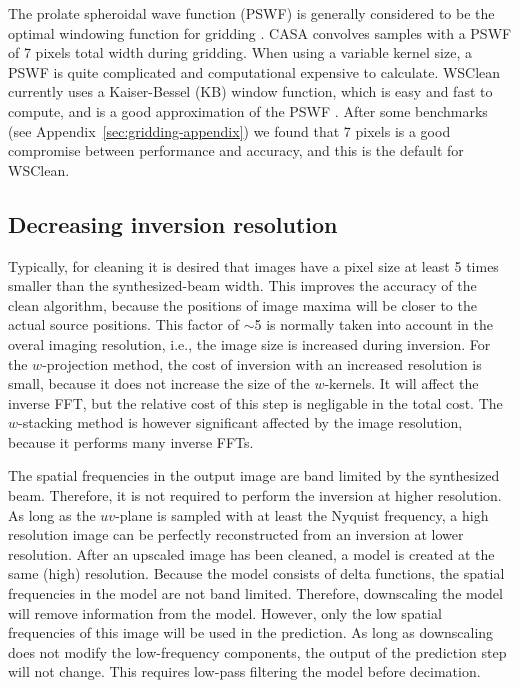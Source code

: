 \documentclass[useAMS,usenatbib]{mn2e}
\begin{document}
The prolate spheroidal wave function (PSWF) is generally considered to be the optimal windowing function for gridding \citep{fourier-kernel-selection-1991}. CASA convolves samples with a PSWF of 7 pixels total width during gridding. When using a variable kernel size, a PSWF is quite complicated and computational expensive to calculate. WSClean currently uses a Kaiser-Bessel (KB) window function, which is easy and fast to compute, and is a good approximation of the PSWF \citep{fourier-kernel-selection-1991}. After some benchmarks (see Appendix~\ref{sec:gridding-appendix}) we found that 7 pixels is a good compromise between performance and accuracy, and this is the default for WSClean.

\subsection{Decreasing inversion resolution} \label{sec:decreasing-inversion-resolution}
Typically, for cleaning it is desired that images have a pixel size at least 5 times smaller than the synthesized-beam width. This improves the accuracy of the clean algorithm, because the positions of image maxima will be closer to the actual source positions. This factor of $\sim$5 is normally taken into account in the overal imaging resolution, i.e., the image size is increased during inversion. For the $w$-projection method, the cost of inversion with an increased resolution is small, because it does not increase the size of the $w$-kernels. It will affect the inverse FFT, but the relative cost of this step is negligable in the total cost. The $w$-stacking method is however significant affected by the image resolution, because it performs many inverse FFTs.

The spatial frequencies in the output image are band limited by the synthesized beam. Therefore, it is not required to perform the inversion at higher resolution. As long as the $uv$-plane is sampled with at least the Nyquist frequency, a high resolution image can be perfectly reconstructed from an inversion at lower resolution. After an upscaled image has been cleaned, a model is created at the same (high) resolution. Because the model consists of delta functions, the spatial frequencies in the model are not band limited. Therefore, downscaling the model will remove information from the model. However, only the low spatial frequencies of this image will be used in the prediction. As long as downscaling does not modify the low-frequency components, the output of the prediction step will not change. This requires low-pass filtering the model before decimation.
\end{document}
